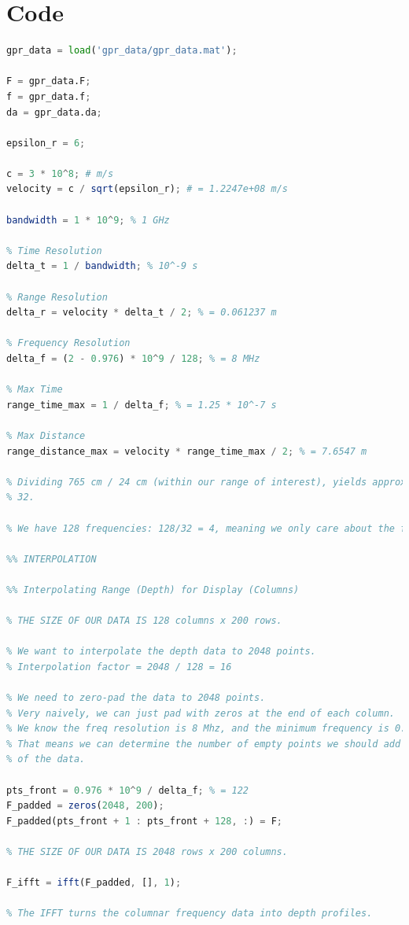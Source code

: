 \documentclass[12pt]{article}
\begin{document}
\section{Code}
\begin{lstlisting}[language=Octave, caption=Ground-Penetrating Radar Range Profile Estimation]
gpr_data = load('gpr_data/gpr_data.mat');

F = gpr_data.F; 
f = gpr_data.f;
da = gpr_data.da;

epsilon_r = 6;

c = 3 * 10^8; # m/s 
velocity = c / sqrt(epsilon_r); # = 1.2247e+08 m/s

bandwidth = 1 * 10^9; % 1 GHz

% Time Resolution
delta_t = 1 / bandwidth; % 10^-9 s

% Range Resolution
delta_r = velocity * delta_t / 2; % = 0.061237 m

% Frequency Resolution
delta_f = (2 - 0.976) * 10^9 / 128; % = 8 MHz

% Max Time 
range_time_max = 1 / delta_f; % = 1.25 * 10^-7 s

% Max Distance
range_distance_max = velocity * range_time_max / 2; % = 7.6547 m

% Dividing 765 cm / 24 cm (within our range of interest), yields approximately
% 32.

% We have 128 frequencies: 128/32 = 4, meaning we only care about the first 4 px.

%% INTERPOLATION

%% Interpolating Range (Depth) for Display (Columns)

% THE SIZE OF OUR DATA IS 128 columns x 200 rows.

% We want to interpolate the depth data to 2048 points.
% Interpolation factor = 2048 / 128 = 16

% We need to zero-pad the data to 2048 points.
% Very naively, we can just pad with zeros at the end of each column.
% We know the freq resolution is 8 Mhz, and the minimum frequency is 0.976 GHz.
% That means we can determine the number of empty points we should add infront
% of the data.

pts_front = 0.976 * 10^9 / delta_f; % = 122
F_padded = zeros(2048, 200);
F_padded(pts_front + 1 : pts_front + 128, :) = F;

% THE SIZE OF OUR DATA IS 2048 rows x 200 columns.

F_ifft = ifft(F_padded, [], 1);

% The IFFT turns the columnar frequency data into depth profiles.


\end{lstlisting}
\end{document}
